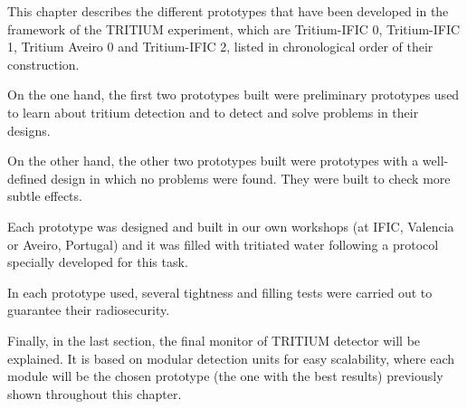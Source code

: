This chapter describes the different prototypes that have been developed in the framework of the TRITIUM experiment, which are Tritium-IFIC 0, Tritium-IFIC 1, Tritium Aveiro 0 and Tritium-IFIC 2, listed in chronological order of their construction.

On the one hand, the first two prototypes built were preliminary prototypes used to learn about tritium detection and to detect and solve problems in their designs.

On the other hand, the other two prototypes built were prototypes with a well-defined design in which no problems were found. They were built to check more subtle effects.

Each prototype was designed and built in our own workshops (at IFIC, Valencia or Aveiro, Portugal) and it was filled with tritiated water following a protocol specially developed for this task.

In each prototype used, several tightness and filling tests were carried out to guarantee their radiosecurity.

Finally, in the last section, the final monitor of TRITIUM detector will be explained. It is based on modular detection units for easy scalability, where each module will be the chosen prototype (the one with the best results) previously shown throughout this chapter.